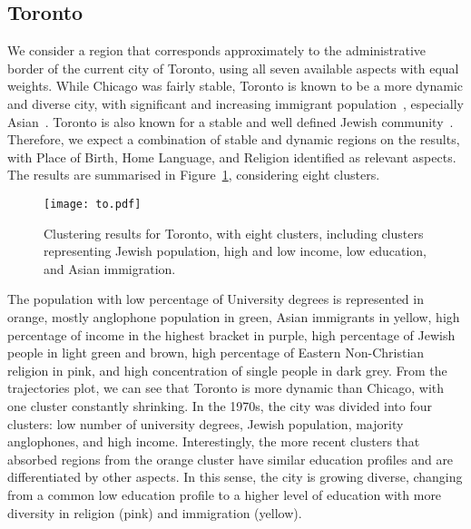 \subsection{Toronto}

We consider a region that corresponds approximately to the administrative border
of the current city of Toronto, using all seven available aspects with equal
weights. While Chicago was fairly stable, Toronto is known to be a more dynamic
and diverse city, with significant and increasing immigrant
population~\citep{hulchanski2007three,Fong2011}, especially
Asian~\citep{Fong2003}. Toronto is also known for a stable and well defined
Jewish community~\citep{Harold2018, Fong2011}. Therefore, we expect a
combination of stable and dynamic regions on the results, with Place of Birth,
Home Language, and Religion identified as relevant aspects. The results are
summarised in Figure~\ref{fig:to}, considering eight clusters.

\begin{figure}
    \centering 
    \texttt{[image: to.pdf]}
    \caption{Clustering results for Toronto, with eight clusters, including
    clusters representing Jewish population, high and low income, low education,
    and Asian immigration.\label{fig:to}}
\end{figure}

The population with low percentage of University degrees is represented in
orange, mostly anglophone population in green, Asian immigrants in yellow, high
percentage of income in the highest bracket in purple, high percentage of Jewish
people in light green and brown, high percentage of Eastern Non-Christian
religion in pink, and high concentration of single people in dark grey. From the
trajectories plot, we can see that Toronto is more dynamic than Chicago, with
one cluster constantly shrinking. In the 1970s, the city was divided into four
clusters: low number of university degrees, Jewish population, majority
anglophones, and high income. Interestingly, the more recent clusters that
absorbed regions from the orange cluster have similar education profiles and are
differentiated by other aspects. In this sense, the city is growing diverse,
changing from a common low education profile to a higher level of education with
more diversity in religion (pink) and immigration (yellow).


